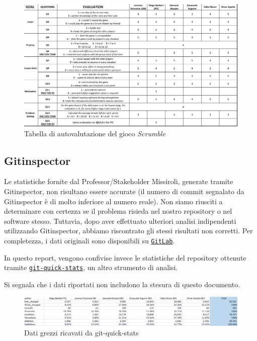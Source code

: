 \documentclass{article}
\begin{document}
\begin{figure}[H]
    \centering
    \includegraphics[width=1\textwidth]{report-scrumble}
    \caption{Tabella di autovalutazione del gioco \textit{Scrumble}}
    \label{fig:scrumble}
\end{figure}


\subsection{Gitinspector}

Le statistiche fornite dal Professor/Stakeholder Missiroli, generate tramite Gitinspector, non risultano essere accurate (il numero di commit 
segnalato da Gitinspector è di molto inferiore al numero reale). Non siamo riusciti a determinare con certezza se il problema risieda nel nostro 
repository o nel software stesso. Tuttavia, dopo aver effettuato ulteriori analisi indipendenti utilizzando Gitinspector, abbiamo riscontrato 
gli stessi risultati non corretti. Per completezza, i dati originali sono disponibili su 
\href{https://gitlab.vezgammon.it/diego/vezgammon/-/tree/main/doc/feedback_stakeholders}{\texttt{GitLab}}.

In questo report, vengono confivise invece le statistiche del repository ottenute tramite 
\href{https://github.com/git-quick-stats/git-quick-stats}{\texttt{git-quick-stats}}, un altro strumento di analisi. 

Si segnala che i dati riportati non includono la stesura di questo documento.

\begin{figure}[H] 
    \centering 
    \includegraphics[width=\textwidth]{report-stats_raw} 
    \caption{Dati grezzi ricavati da git-quick-stats} 
    \label{fig:stats_raw} 
\end{figure}
\end{document}
